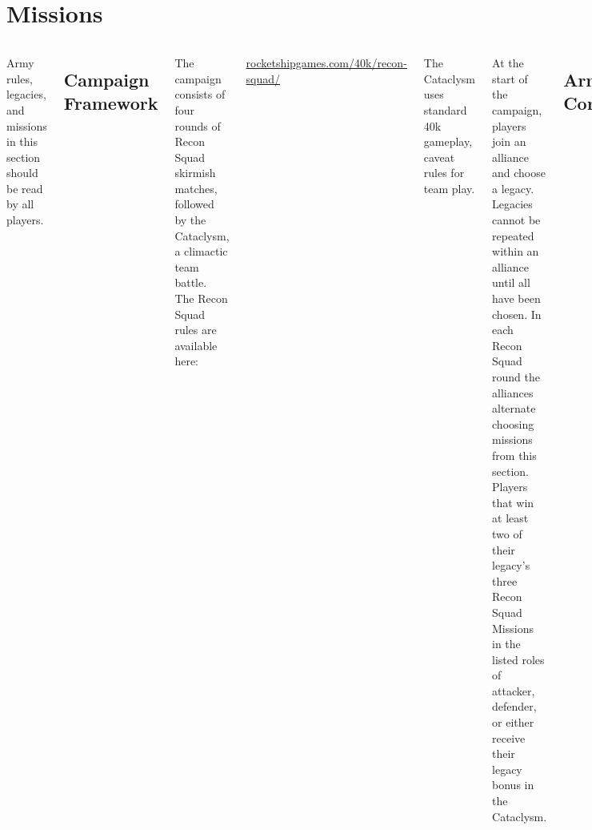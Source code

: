 \clearpage
\section{Missions}

\begin{columns}
  
  Army rules, legacies, and missions in this section should be read by
  all players.

\subsection{Campaign Framework}

The campaign consists of four rounds of Recon Squad skirmish matches,
followed by the Cataclysm, a climactic team battle.
The Recon Squad rules are available here:

\smallskip
\centerline{\url{rocketshipgames.com/40k/recon-squad/}}

\smallskip%
The Cataclysm uses standard 40k gameplay, caveat rules for team play.

At the start of the campaign, players join an alliance and choose a
legacy.  Legacies cannot be repeated within an alliance until all have
been chosen.  In each Recon Squad round the alliances alternate
choosing missions from this section.  Players that win at least two of
their legacy's three Recon Squad Missions in the listed roles of
attacker, defender, or either receive their legacy bonus in the
Cataclysm.

\subsection{Army Construction}

Each player must prepare two lists:

\begin{squishitemize}
  \item {Recon Squad:} For the skirmishes;
  \item {Cataclysm:} For the climactic finale.
\end{squishitemize}

Recon Squad lists are selected to at most~200 points, following the
rules in that packet.  Cataclysm lists are selected to at most~500
points by these rules:

  \begin{squishitemize}
  \item Each player's Recon Squad Detachment must be in their
    Cataclysm list.


\end{squishitemize}
\end{columns}
